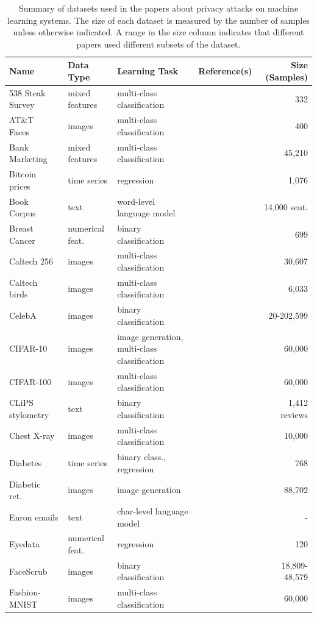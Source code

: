 \begin{table}[!t]
\scriptsize
\renewcommand{\arraystretch}{1.0}
\caption{Summary of datasets used in the papers about privacy attacks on machine learning systems. The size of each dataset is measured by the number of samples unless otherwise indicated. A range in the size column indicates that different papers used different subsets of the dataset.}
\begin{tabular}{p{3cm} p{2cm} p{3.2cm} p{2.5cm} r}
\toprule
\textbf{Name} & \textbf{Data Type} & \textbf{Learning Task} & \textbf{Reference(s)} & \textbf{Size (Samples)}\\
\hline
538 Steak Survey~ & mixed features & multi-class classification &  & 332 \\
AT\&T Faces~ & images & multi-class classification &  & 400 \\
Bank Marketing~ & mixed features & multi-class classification &  & 45,210 \\
Bitcoin prices & time series & regression &  & 1,076 \\
Book Corpus~ & text & word-level language model &  & 14,000 sent. \\
Breast Cancer~ & numerical feat. & binary classification &  & 699 \\
Caltech 256~ & images & multi-class classification &  & 30,607 \\
Caltech birds~ & images & multi-class classification &  & 6,033 \\
CelebA~ & images & binary classification &  & 20-202,599 \\
CIFAR-10~ & images & image generation, multi-class classification &  & 60,000 \\
CIFAR-100~ & images & multi-class classification &  & 60,000 \\
CLiPS stylometry~ & text & binary classification &  & 1,412 reviews \\
Chest X-ray~ &images & multi-class classification &  & 10,000\\
Diabetes~ & time series & binary class., regression &  & 768 \\
Diabetic ret.~ & images & image generation &  & 88,702 \\
Enron emails & text & char-level language model &  & - \\  
Eyedata~ & numerical feat.& regression &  & 120 \\
FaceScrub~ & images & binary classification &  & 18,809-48,579 \\ 
Fashion-MNIST~ & images & multi-class classification &  & 60,000 \\

\end{tabular}
\end{table}

